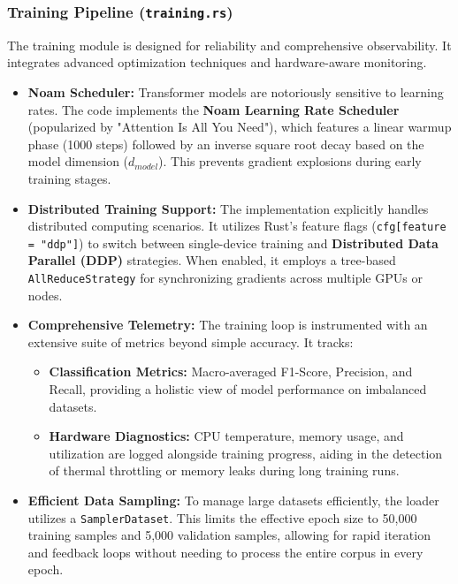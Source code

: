 \documentclass[10pt,a4paper,twocolumn]{article}
\begin{document}
\subsubsection{Training Pipeline (\texttt{training.rs})}
The training module is designed for reliability and comprehensive observability. It integrates advanced optimization techniques and hardware-aware monitoring.
\begin{itemize}
    \item \textbf{Noam Scheduler:} Transformer models are notoriously sensitive to learning rates. The code implements the \textbf{Noam Learning Rate Scheduler} (popularized by "Attention Is All You Need"), which features a linear warmup phase (1000 steps) followed by an inverse square root decay based on the model dimension ($d_{model}$). This prevents gradient explosions during early training stages.
    
    \item \textbf{Distributed Training Support:} The implementation explicitly handles distributed computing scenarios. It utilizes Rust's feature flags (\texttt{cfg[feature = "ddp"]}) to switch between single-device training and \textbf{Distributed Data Parallel (DDP)} strategies. When enabled, it employs a tree-based \texttt{AllReduceStrategy} for synchronizing gradients across multiple GPUs or nodes.
    
    \item \textbf{Comprehensive Telemetry:} The training loop is instrumented with an extensive suite of metrics beyond simple accuracy. It tracks:
    \begin{itemize}
        \item \textbf{Classification Metrics:} Macro-averaged F1-Score, Precision, and Recall, providing a holistic view of model performance on imbalanced datasets.
        \item \textbf{Hardware Diagnostics:} CPU temperature, memory usage, and utilization are logged alongside training progress, aiding in the detection of thermal throttling or memory leaks during long training runs.
    \end{itemize}
    
    \item \textbf{Efficient Data Sampling:} To manage large datasets efficiently, the loader utilizes a \texttt{SamplerDataset}. This limits the effective epoch size to 50,000 training samples and 5,000 validation samples, allowing for rapid iteration and feedback loops without needing to process the entire corpus in every epoch.
\end{itemize}
\end{document}
